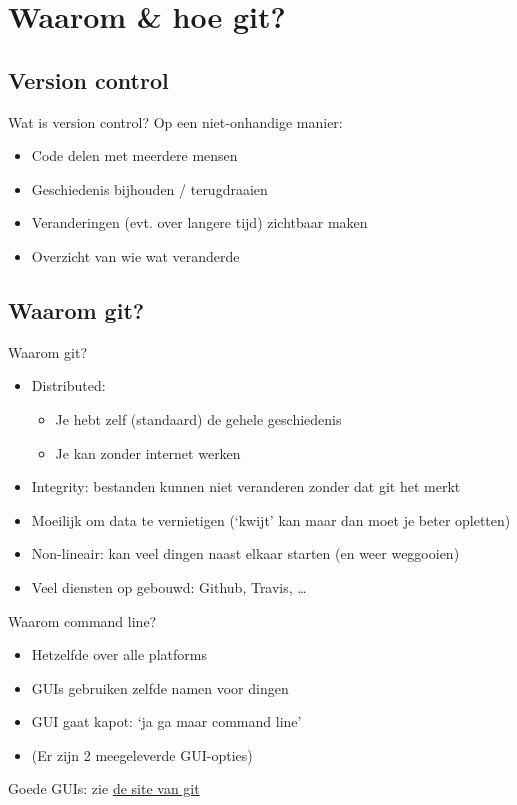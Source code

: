 \section[W\&H?]{Waarom \& hoe git?}

\subsection{Version control}
\begin{frame}{Wat is version control?}
	Op een niet-onhandige manier:
		\begin{itemize}
			\item Code delen met meerdere mensen
			\item Geschiedenis bijhouden / terugdraaien
			\item Veranderingen (evt. over langere tijd) zichtbaar maken
			\item Overzicht van wie wat veranderde
		\end{itemize}
\end{frame}

\subsection{Waarom git?}
\begin{frame}{Waarom git?}
	\begin{itemize}
		\item Distributed:
			\begin{itemize}
				\item Je hebt zelf (standaard) de gehele geschiedenis
				\item Je kan zonder internet werken
			\end{itemize}
		\item Integrity: bestanden kunnen niet veranderen zonder dat git het merkt
		\item Moeilijk om data te vernietigen (`kwijt' kan maar dan moet je beter opletten)
		\item Non-lineair: kan veel dingen naast elkaar starten (en weer weggooien)
		\item Veel diensten op gebouwd: Github, Travis, \ldots
	\end{itemize}
\end{frame}

\begin{frame}{Waarom command line?}
	\begin{itemize}
		\item Hetzelfde over alle platforms
		\item GUIs gebruiken zelfde namen voor dingen
		\item GUI gaat kapot: `ja ga maar command line'
		\item (Er zijn 2 meegeleverde GUI-opties)
	\end{itemize}
	Goede GUIs: zie \href{https://git-scm.com/downloads/guis}{de site van git}
\end{frame}
